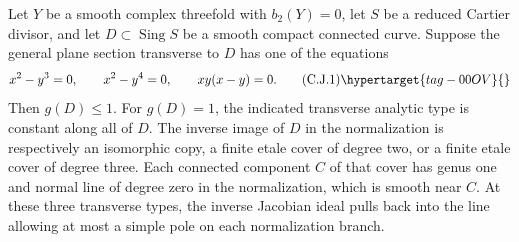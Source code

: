 \begin{proposition}\hypertarget{tag-01FJ}{}\label{cdp:st:C2d}

Let $Y$ be a smooth complex threefold with $b_2(Y)=0$, let $S$ be a reduced Cartier divisor, and let $D\subset\operatorname{Sing}S$ be a smooth compact connected curve. Suppose the general plane section transverse to $D$ has one of the equations
\[
 x^2-y^3=0,\qquad x^2-y^4=0,\qquad xy(x-y)=0.
 \tag{C.J.1}\hypertarget{tag-00OV}{}\label{cdp:eq:C.J.1}
\]
Then $g(D)\le1$. For $g(D)=1$, the indicated transverse analytic type is constant along all of $D$. The inverse image of $D$ in the normalization is respectively an isomorphic copy, a finite etale cover of degree two, or a finite etale cover of degree three. Each connected component $C$ of that cover has genus one and normal line of degree zero in the normalization, which is smooth near $C$. At these three transverse types, the inverse Jacobian ideal pulls back into the line allowing at most a simple pole on each normalization branch.
\end{proposition}


